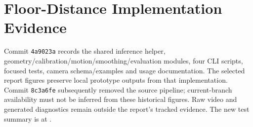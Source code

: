 \section{Floor-Distance Implementation Evidence}
Commit \texttt{4a9023a} records the shared inference helper, geometry/calibration/motion/smoothing/evaluation modules, four CLI scripts, focused tests, camera schema/examples and usage documentation. The selected report figures preserve local prototype outputs from that implementation. Commit \texttt{8c3a6fe} subsequently removed the source pipeline; current-branch availability must not be inferred from these historical figures. Raw video and generated diagnostics remain outside the report's tracked evidence. The new test summary is at .
